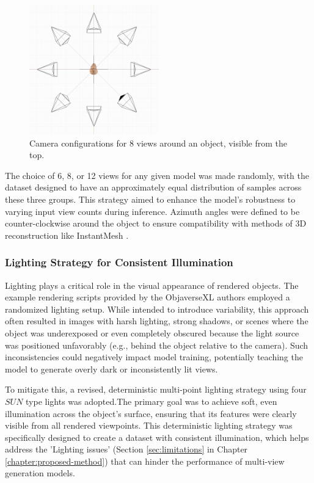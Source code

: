 \begin{figure}[h]
  \centering
  \includegraphics[width=0.5\textwidth, angle=180]{images/data/rendering-up.jpeg}
  \caption{Camera configurations for 8 views around an object, visible from the top.}
  \label{fig:camera-setups-up}
\end{figure}

The choice of 6, 8, or 12 views for any given model was made randomly, with the dataset designed to have an approximately equal distribution of samples across these three groups. This strategy aimed to enhance the model's robustness to varying input view counts during inference. Azimuth angles were defined to be counter-clockwise around the object to ensure compatibility with methods of 3D reconstruction like InstantMesh \cite{instantmesh}.

\subsubsection{Lighting Strategy for Consistent Illumination}\label{sssec:lighting-strategy}
Lighting plays a critical role in the visual appearance of rendered objects. The example rendering scripts provided by the ObjaverseXL authors \cite{objaverse} employed a randomized lighting setup. While intended to introduce variability, this approach often resulted in images with harsh lighting, strong shadows, or scenes where the object was underexposed or even completely obscured because the light source was positioned unfavorably (e.g., behind the object relative to the camera). Such inconsistencies could negatively impact model training, potentially teaching the model to generate overly dark or inconsistently lit views.

To mitigate this, a revised, deterministic multi-point lighting strategy using four $SUN$ type lights was adopted.The primary goal was to achieve soft, even illumination across the object's surface, ensuring that its features were clearly visible from all rendered viewpoints. This deterministic lighting strategy was specifically designed to create a dataset with consistent illumination, which helps address the 'Lighting issues' (Section \ref{sec:limitations} in Chapter \ref{chapter:proposed-method}) that can hinder the performance of multi-view generation models.

